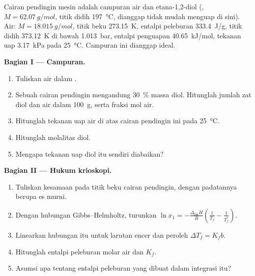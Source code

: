 \begin{problem}
\label{pb:b2:chemical-potential:1}
Cairan pendingin mesin adalah campuran air dan etana-1,2-diol
(, $M = \qty{62.07}{g/mol}$, titik didih
\qty{197}{\celsius}, dianggap tidak mudah menguap di sini). Air:
$M = \qty{18.015}{g/mol}$, titik beku \qty{273.15}{K}, entalpi peleburan
\qty{333.4}{J/g}, titik didih \qty{373.12}{K} di bawah \qty{1.013}{bar},
entalpi penguapan \qty{40.65}{kJ/mol}, tekanan uap \qty{3.17}{kPa} pada
\qty{25}{\celsius}. Campuran ini dianggap ideal.

\medskip
\noindent\textbf{Bagian I --- Campuran.}
\begin{enumerate}
  \item Tuliskan  air dalam .
  \item Sebuah cairan pendingin mengandung \qty{30}{\percent} massa diol.
        Hitunglah jumlah zat diol dan air dalam \qty{100}{g}, serta fraksi
        mol air.
  \item Hitunglah tekanan uap air di atas cairan pendingin ini pada
        \qty{25}{\celsius}.
  \item Hitunglah molalitas diol.
  \item Mengapa tekanan uap diol itu sendiri diabaikan?
\end{enumerate}

\medskip
\noindent\textbf{Bagian II --- Hukum krioskopi.}
\begin{enumerate}[resume]
  \item Tuliskan kesamaan  pada titik beku cairan
        pendingin, dengan padatannya berupa es murni.
  \item Dengan hubungan Gibbs--Helmholtz, turunkan $\ln x_1 =
        -\frac{\Delta_{\text{fus}}H}{R}\left(\frac1{T_f} - \frac1{T_f^*}\right)$.
  \item Linearkan hubungan itu untuk larutan encer dan peroleh
        $\Delta T_f = K_f b$.
  \item Hitunglah entalpi peleburan molar air dan $K_f$.
  \item Asumsi apa tentang entalpi peleburan yang dibuat dalam integrasi
        itu?
\end{enumerate}


\end{problem}
